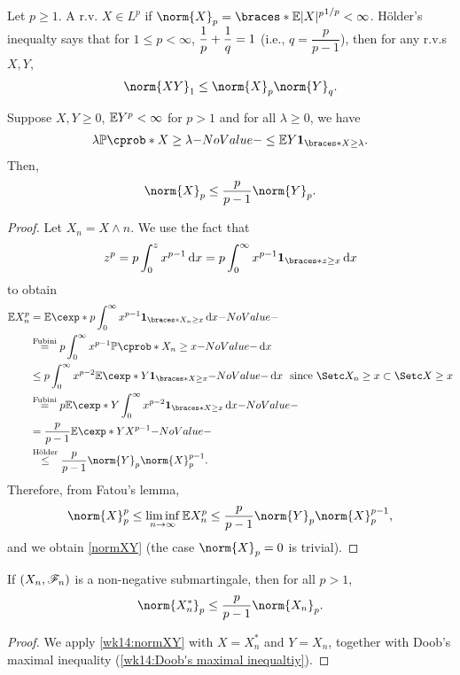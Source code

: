 \documentclass[12pt]{article}
\begin{document}
Let $p\geq 1$. A r.v. $X \in L^p$ if $\norm{X}_p = \braces*{\E |X|^p}^{1/p} <\infty$. H\"older's inequalty says that for $1\leq p <\infty$, ${\dfrac{1}{p}} + {\dfrac{1}{q}} =1$ (i.e., $q=\dfrac{p}{p-1}$), then for any r.v.s $X, Y$, 
\begin{align*}
\norm{XY}_1 \leq \norm{X}_p\norm{Y}_q.
\end{align*}

\begin{Lemma}\label{wk14:normXY}
Suppose $X, Y\geq 0$, $\E Y^p < \infty$ for $p>1$ and for all $\lambda\geq 0$, we have
\begin{align*}
\lambda\P(X\geq\lambda) \leq \E Y\indicator{X\geq\lambda}.
\end{align*}
Then, 
\begin{align}\label{normXY}
\norm{X}_p \leq \frac{p}{p-1} \norm{Y}_p.
\end{align}
\end{Lemma}
\begin{proof}
Let $X_n = X\wedge n$. We use the fact that
\begin{align*}
z^p = p \int_0^z x^{p-1} \ud x = p \int_0^\infty x^{p-1}\indicator{z\geq x}\ud x
\end{align*}
to obtain
\begin{align*}
\E X_n^p 
&= \E[ p\int_0^\infty x^{p-1}\indicator{X_n\geq x} \ud x] \\
&\eqa{\text{Fubini}} p \int_0^\infty x^{p-1} \P(X_n\geq x) \ud x \\
&\leq p \int_0^\infty x^{p-2} \E[Y\indicator{X\geq x}] \ud x\ \text{  since $\set{X_n\geq x}\subset\set{X\geq x}$} \\
&\eqa{\text{Fubini}} p \E[Y \int_0^\infty x^{p-2}\indicator{X\geq x} \ud x] \\
&= \frac{p}{p-1} \E[YX^{p-1}] \\
&\lea{\text{H\"older}} \frac{p}{p-1} \norm{Y}_p \norm{X}_p^{p-1}. 
\end{align*}
Therefore, from Fatou's lemma,
\begin{align*}
\norm{X}_p^p \leq \liminf_{n\to\infty} \E X_n^p \leq \frac{p}{p-1} \norm{Y}_p \norm{X}_p^{p-1},
\end{align*}
and we obtain \cref{normXY} (the case $\norm{X}_p=0$ is trivial).
\end{proof}

\begin{Theorem}\label{wk14:DoobLp}
If $(X_n,\mathscr{F}_n)$ is a non-negative submartingale, then for all $p>1$, 
\begin{align}
\norm{X_n^*}_p \leq \frac{p}{p-1} \norm{X_n}_p.
\end{align}
\end{Theorem}
\begin{proof}
We apply \cref{wk14:normXY} with $X=X_n^*$ and $Y=X_n$, together with Doob's maximal inequality (\cref{wk14:Doob's maximal inequaltiy}).
\end{proof}
\end{document}
